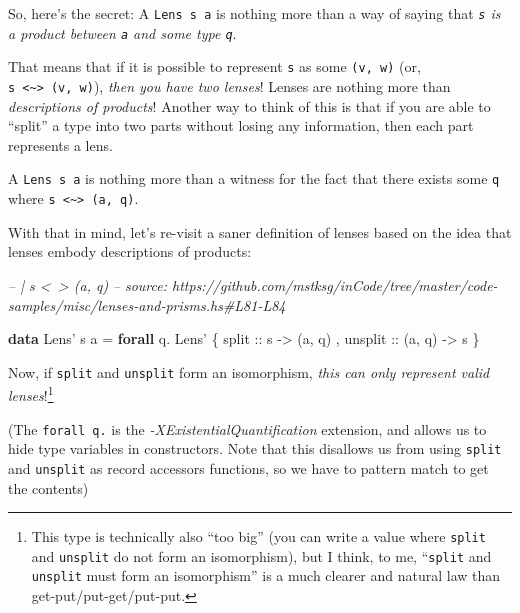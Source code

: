\documentclass[]{article}
\newenvironment{Shaded}{}{}
\newcommand{\CommentTok}[1]{\textcolor[rgb]{0.38,0.63,0.69}{\textit{#1}}}
\newcommand{\DataTypeTok}[1]{\textcolor[rgb]{0.56,0.13,0.00}{#1}}
\newcommand{\FunctionTok}[1]{\textcolor[rgb]{0.02,0.16,0.49}{#1}}
\newcommand{\KeywordTok}[1]{\textcolor[rgb]{0.00,0.44,0.13}{\textbf{#1}}}
\newcommand{\NormalTok}[1]{#1}
\newcommand{\OtherTok}[1]{\textcolor[rgb]{0.00,0.44,0.13}{#1}}
\begin{document}
So, here's the secret: A \texttt{Lens\textquotesingle{}\ s\ a} is nothing more
than a way of saying that \emph{\texttt{s} is a product between \texttt{a} and
some type \texttt{q}}.

That means that if it is possible to represent \texttt{s} as some
\texttt{(v,\ w)} (or,
\texttt{s\ \textless{}\textasciitilde{}\textgreater{}\ (v,\ w)}), \emph{then you
have two lenses}! Lenses are nothing more than \emph{descriptions of products}!
Another way to think of this is that if you are able to ``split'' a type into
two parts without losing any information, then each part represents a lens.

A \texttt{Lens\textquotesingle{}\ s\ a} is nothing more than a witness for the
fact that there exists some \texttt{q} where
\texttt{s\ \textless{}\textasciitilde{}\textgreater{}\ (a,\ q)}.

With that in mind, let's re-visit a saner definition of lenses based on the idea
that lenses embody descriptions of products:

\begin{Shaded}
\begin{Highlighting}[]
\CommentTok{-- | s <~> (a, q)}
\CommentTok{-- source: https://github.com/mstksg/inCode/tree/master/code-samples/misc/lenses-and-prisms.hs#L81-L84}

\KeywordTok{data} \DataTypeTok{Lens'}\NormalTok{ s a }\FunctionTok{=} \KeywordTok{forall}\NormalTok{ q}\FunctionTok{.} \DataTypeTok{Lens'}
\NormalTok{    \{}\OtherTok{ split   ::}\NormalTok{ s }\OtherTok{->}\NormalTok{ (a, q)}
\NormalTok{    ,}\OtherTok{ unsplit ::}\NormalTok{ (a, q) }\OtherTok{->}\NormalTok{ s}
\NormalTok{    \}}
\end{Highlighting}
\end{Shaded}

Now, if \texttt{split} and \texttt{unsplit} form an isomorphism, \emph{this can
only represent valid lenses}!\footnote{This type is technically also ``too big''
  (you can write a value where \texttt{split} and \texttt{unsplit} do not form
  an isomorphism), but I think, to me, ``\texttt{split} and \texttt{unsplit}
  must form an isomorphism'' is a much clearer and natural law than
  get-put/put-get/put-put.}

(The \texttt{forall\ q.} is the \emph{-XExistentialQuantification} extension,
and allows us to hide type variables in constructors. Note that this disallows
us from using \texttt{split} and \texttt{unsplit} as record accessors functions,
so we have to pattern match to get the contents)
\end{document}
